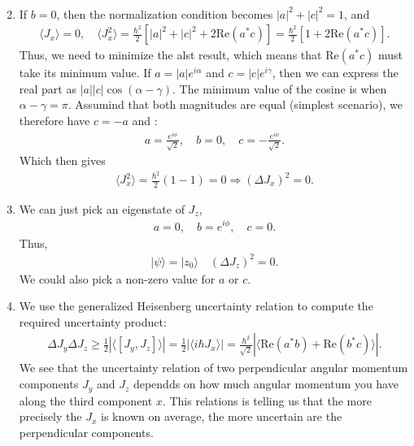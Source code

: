 \documentclass[letterpaper,11pt,twoside]{article}
\newcommand{\ket}[1]{|#1\rangle}
\newcommand{\braket}[1]{\langle#1\rangle}
\newcommand{\re}[1]{\text{Re}\left(#1\right)}
\begin{document}
\begin{enumerate}[itemsep=0pt,topsep=0pt,label=\alph*)]
\begin{align*}
  \end{align*}
  \item If $b=0$, then the normalization condition becomes $|a|^2+|c|^2=1$, and 
  \begin{align*}
    \braket{J_x}=0,\quad\braket{J_x^2}=\frac{\hbar^2}{2}[|a|^2+|c|^2+2\re{a^*c}]=\frac{\hbar^2}{2}[1+2\re{a^*c}].
  \end{align*}
  Thus, we need to minimize the alst result, which means that $\re{a^*c}$ must take its minimum value. If $a=|a|e^{i\alpha}$ and $c=|c|e^{i\gamma}$, then 
  we can express the real part as $|a||c|\cos(\alpha-\gamma)$. The minimum value of the cosine is when $\alpha-\gamma=\pi$. Assumind that both magnitudes are equal (simplest scenario), we therefore have $c=-a$ and :
  \begin{align*}
    a=\frac{e^{i\phi}}{\sqrt{2}},\quad b=0,\quad c=-\frac{e^{i\phi}}{\sqrt{2}}.
  \end{align*} 
  Which then gives 
  \begin{align*}
    \braket{J_x^2}=\frac{\hbar^2}{2}(1-1)=0\Longrightarrow(\Delta J_x)^2=0.
  \end{align*}
  \item We can just pick an eigenstate of $J_z$,
  \begin{align*}
    a=0,\quad b=e^{i\phi},\quad c=0.
  \end{align*}
  Thus,
  \begin{align*}
    \ket{\psi}=\ket{z_0}\quad (\Delta J_z)^2=0.
  \end{align*}
  We could also pick a non-zero value for $a$ or $c$.
  \item We use the generalized Heisenberg uncertainty relation to compute the required uncertainty product:
  \begin{align*}
    \Delta J_y\Delta J_z\geq\frac{1}{2}|\braket{[J_y,J_z]}|=\frac{1}{2}|\braket{i\hbar J_x}|=\frac{\hbar^2}{\sqrt{2}}|\braket{\re{a^*b}+\re{b^*c}}|.
  \end{align*}
  We see that the uncertainty relation of two perpendicular angular momentum components $J_y$ and $J_z$ dependds on how much angular momentum you have along the third component $x$.
  This relations is telling us that the more precisely the $J_x$ is known on average, the more uncertain are the perpendicular components.
\end{enumerate}


\end{document}
